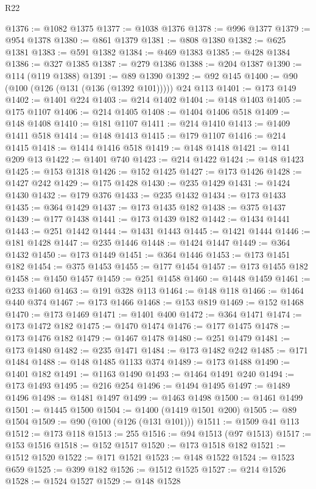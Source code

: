 \begin{lexlean}{R22}
\begin{coremodule}
@1376 := @1082 @1375
@1377 := @1038 @1376
@1378 := @996 @1377
@1379 := @954 @1378
@1380 := @861 @1379
@1381 := @808 @1380
@1382 := @625 @1381
@1383 := @591 @1382
@1384 := @469 @1383
@1385 := @428 @1384
@1386 := @327 @1385
@1387 := @279 @1386
@1388 := @204 @1387
@1390 := @114 (@119 @1388)
@1391 := @89 @1390
@1392 := @92 @145
@1400 := @90 (@100 (@126 (@131 (@136 (@1392 @101))))) @24 @113
@1401 := @173 @149
@1402 := @1401 @224
@1403 := @214 @1402
@1404 := @148 @1403
@1405 := @175 @1107
@1406 := @214 @1405
@1408 := @1404 @1406 @518
@1409 := @148 @1408
@1410 := @181 @1107
@1411 := @214 @1410
@1413 := @1409 @1411 @518
@1414 := @148 @1413
@1415 := @179 @1107
@1416 := @214 @1415
@1418 := @1414 @1416 @518
@1419 := @148 @1418
@1421 := @141 @209 @13
@1422 := @1401 @740
@1423 := @214 @1422
@1424 := @148 @1423
@1425 := @153 @1318
@1426 := @152 @1425
@1427 := @173 @1426
@1428 := @1427 @242
@1429 := @175 @1428
@1430 := @235 @1429
@1431 := @1424 @1430
@1432 := @179 @376
@1433 := @235 @1432
@1434 := @173 @1433
@1435 := @364 @1429
@1437 := @173 @1435 @182
@1438 := @375 @1437
@1439 := @177 @1438
@1441 := @173 @1439 @182
@1442 := @1434 @1441
@1443 := @251 @1442
@1444 := @1431 @1443
@1445 := @1421 @1444
@1446 := @181 @1428
@1447 := @235 @1446
@1448 := @1424 @1447
@1449 := @364 @1432
@1450 := @173 @1449
@1451 := @364 @1446
@1453 := @173 @1451 @182
@1454 := @375 @1453
@1455 := @177 @1454
@1457 := @173 @1455 @182
@1458 := @1450 @1457
@1459 := @251 @1458
@1460 := @1448 @1459
@1461 := @233 @1460
@1463 := @191 @328 @113
@1464 := @148 @118
@1466 := @1464 @440 @374
@1467 := @173 @1466
@1468 := @153 @819
@1469 := @152 @1468
@1470 := @173 @1469
@1471 := @1401 @400
@1472 := @364 @1471
@1474 := @173 @1472 @182
@1475 := @1470 @1474
@1476 := @177 @1475
@1478 := @173 @1476 @182
@1479 := @1467 @1478
@1480 := @251 @1479
@1481 := @173 @1480
@1482 := @235 @1471
@1484 := @173 @1482 @242
@1485 := @171 @1484
@1488 := @148 @1485 @1133 @374
@1489 := @173 @1488
@1490 := @1401 @182
@1491 := @1163 @1490
@1493 := @1464 @1491 @240
@1494 := @173 @1493
@1495 := @216 @254
@1496 := @1494 @1495
@1497 := @1489 @1496
@1498 := @1481 @1497
@1499 := @1463 @1498
@1500 := @1461 @1499
@1501 := @1445 @1500
@1504 := @1400 (@1419 @1501 @200)
@1505 := @89 @1504
@1509 := @90 (@100 (@126 (@131 @101)))
@1511 := @1509 @41 @113
@1512 := @173 @118
@1513 := 255
@1516 := @94 @1513 (@97 @1513)
@1517 := @153 @1516
@1518 := @152 @1517
@1520 := @173 @1518 @182
@1521 := @1512 @1520
@1522 := @171 @1521
@1523 := @148 @1522
@1524 := @1523 @659
@1525 := @399 @182
@1526 := @1512 @1525
@1527 := @214 @1526
@1528 := @1524 @1527
@1529 := @148 @1528

\end{coremodule}
\end{lexlean}
